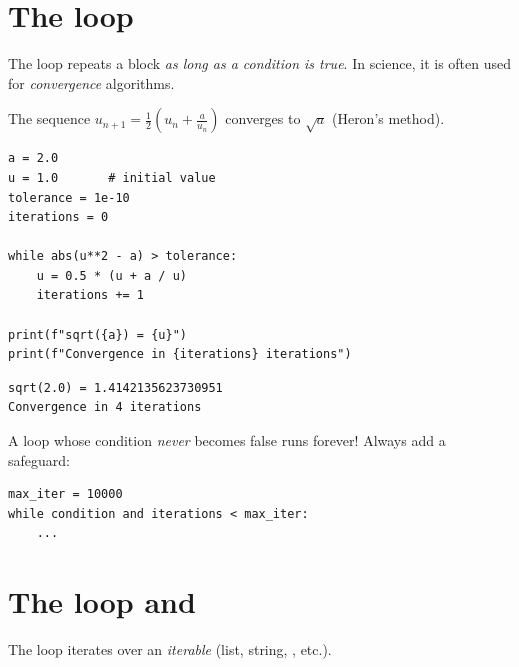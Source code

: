 \section{The  loop}

The  loop repeats a block \emph{as long as a condition is true}.
In science, it is often used for \emph{convergence} algorithms.

\begin{example}
The sequence $u_{n+1} = \frac{1}{2}\left(u_n + \frac{a}{u_n}\right)$ converges to $\sqrt{a}$
(Heron's method).
\end{example}

\begin{codeblock}[title=\textbf{Python}]
\begin{verbatim}
a = 2.0
u = 1.0       # initial value
tolerance = 1e-10
iterations = 0

while abs(u**2 - a) > tolerance:
    u = 0.5 * (u + a / u)
    iterations += 1

print(f"sqrt({a}) = {u}")
print(f"Convergence in {iterations} iterations")
\end{verbatim}
\end{codeblock}

\begin{codeoutput}
\begin{verbatim}
sqrt(2.0) = 1.4142135623730951
Convergence in 4 iterations
\end{verbatim}
\end{codeoutput}

\begin{warning}
A  loop whose condition \emph{never} becomes false runs
forever! Always add a safeguard:
\begin{verbatim}
max_iter = 10000
while condition and iterations < max_iter:
    ...
\end{verbatim}
\end{warning}

\section{The  loop and }

The  loop iterates over an \emph{iterable} (list, string, , etc.).

